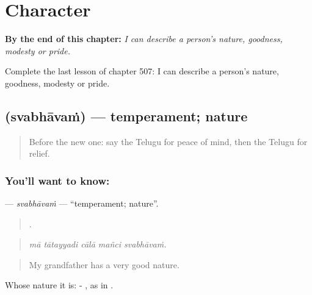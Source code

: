 
\chapter{Character}
\label{ch:te-character}

\begin{chapteropening}
\textbf{By the end of this chapter:} \emph{I can describe a person's nature, goodness, modesty or pride.}

Complete the last lesson of chapter 507: I can describe a person's nature, goodness, modesty or pride.
\end{chapteropening}

\section[\texorpdfstring{\te{స్వభావం} (svabhāvaṁ)}{స్వభావం (svabhāvaṁ)}]{ (svabhāvaṁ) — temperament; nature}

\label{lesson:TE-C507-svabhavam}



\begin{quote}
Before the new one: say the Telugu for peace of mind, then the Telugu for relief.
\end{quote}

\subsection*{You'll want to know: }
\textbf{} — \emph{svabhāvaṁ} — \textquotedblleft{}temperament; nature\textquotedblright{}.

\begin{quote}
    .
\end{quote}

\begin{quote}
\emph{mā tātayyadi cālā mañci svabhāvaṁ.}
\end{quote}

\begin{quote}
My grandfather has a very good nature.
\end{quote}

Whose nature it is: - , as in  .

